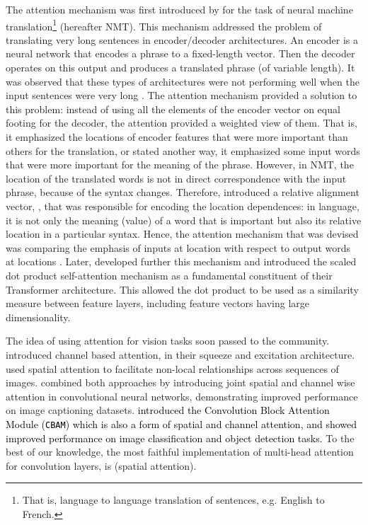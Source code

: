 \documentclass[times, 5p]{elsarticle}
\begin{document}
The attention mechanism was first introduced by \cite{bahdanau2014neural} for the task of neural machine translation\footnote{That is, language to language translation of sentences, e.g. English to French.} (hereafter NMT).  This mechanism addressed the problem of translating very long sentences in encoder/decoder architectures. An encoder is a neural network that encodes a phrase to a fixed-length vector. Then the decoder operates on this output and produces a translated phrase (of variable length). It was observed that these types of architectures were not performing well when the input sentences were very long \citep{DBLP:journals/corr/ChoMBB14}.    
The attention mechanism provided a solution to this problem: instead of using all the elements of the encoder vector on equal footing for the decoder, the attention provided a weighted view of them. That is, it emphasized  the locations of encoder features that were more important than others for the translation, or stated another way,  it emphasized some input words that were more important for the meaning of the phrase. However, in NMT, the location of the translated words is not in direct correspondence with the input phrase, because of the syntax changes.  Therefore, \cite{bahdanau2014neural} introduced a relative alignment vector, , that was responsible for encoding the location dependences: in language, it is not only the meaning (value) of a word that is important but also its relative location in a particular syntax.   Hence, the attention mechanism that was devised  was comparing the emphasis of inputs at location  with respect to output words at locations .  
Later, \cite{DBLP:journals/corr/VaswaniSPUJGKP17} developed further this mechanism and introduced the scaled dot product self-attention mechanism as a fundamental constituent of their Transformer architecture. This allowed the dot product to be used as a similarity measure  between feature layers, including  feature vectors having large dimensionality. 

The idea of using attention for vision tasks soon passed to the community. \cite{DBLP:journals/corr/abs-1709-01507} introduced channel based attention, in their squeeze and excitation architecture. \cite{DBLP:journals/corr/abs-1711-07971} used spatial attention to facilitate non-local relationships across sequences of images. \cite{DBLP:journals/corr/ChenZXNSC16} combined both approaches by introducing joint spatial and channel wise attention in convolutional neural networks, demonstrating improved performance on image captioning datasets.   
\textcolor{black}{
\cite{10.1007/978-3-030-01234-2_1} introduced the 
 Convolution Block Attention Module (\texttt{CBAM}) which is also a form of spatial and channel attention, and showed improved performance on image classification and object detection tasks.}
 To the best of our knowledge, the most faithful implementation  of multi-head  attention \citep{DBLP:journals/corr/VaswaniSPUJGKP17} for convolution layers, is \cite{DBLP:journals/corr/abs-1904-09925} (spatial attention). 
\end{document}
